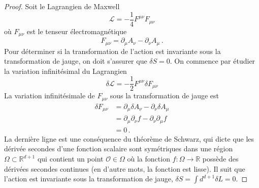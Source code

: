 \documentclass{article}
\numberwithin{equation}{section}
\theoremstyle{solution}
\begin{document}
\begin{proof}
Soit le Lagrangien de Maxwell
\begin{equation}
        \mathcal{L} = -\frac{1}{4}F^{\mu \nu}F_{\mu\nu} %
\end{equation} 
où $F_{\mu\nu}$ est le tenseur électromagnétique %
\begin{equation}\label{eq:F}
        F_{\mu\nu} = \partial_{\mu}A_\nu - \partial_{\nu}A_\mu\, .
\end{equation} 
Pour déterminer si la transformation de l'action est invariante sous la transformation de jauge, on doit s'assurer que $\delta S = 0$.
On commence par étudier la variation infinitésimal du Lagrangien
\begin{equation}
        \delta \mathcal{L} = -\frac{1}{2}F^{\mu \nu} \delta F_{\mu \nu}
\end{equation} 
La variation infinitésimale de $F_{\mu \nu}$ sous la transformation de jauge est
\begin{align*}
        \delta F_{\mu \nu} &= \partial_{\mu}\delta A_{\nu} - \partial_{\nu} \delta A_\mu \\
        &= \partial_{\mu}\partial_\nu f - \partial_{\nu} \partial_\mu f \\
        &= 0\, .
\end{align*}
La dernière ligne est une conséquence du théorème de Schwarz, qui dicte que les dérivée secondes d'une fonction scalaire sont symétriques dans une région $\Omega \subset \mathbb{R}^{d+1}$ qui 
contient un point $\mathcal{O} \in \Omega$ où la fonction $f:\Omega \rightarrow \mathbb{R}$ possède des dérivées secondes continues (en d'autre mots, la fonction est lisse). 
Il suit que l'action est invariante sous la transformation de jauge, 
$\delta S = \int d^{d+1} \delta L = 0$.
\end{proof}
\end{document}
